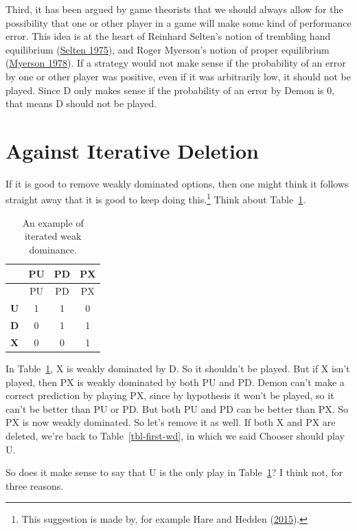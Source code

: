 \documentclass[
  12pt,
  letterpaper,
  DIV=11,
  numbers=noendperiod]{scrreprt}
\begin{document}
Third, it has been argued by game theorists that we should always allow
for the possibility that one or other player in a game will make some
kind of performance error. This idea is at the heart of Reinhard
Selten's notion of trembling hand equilibrium
(\protect\hyperlink{ref-Selten1975}{Selten 1975}), and Roger Myerson's
notion of proper equilibrium
(\protect\hyperlink{ref-Myerson1978}{Myerson 1978}). If a strategy would
not make sense if the probability of an error by one or other player was
positive, even if it was arbitrarily low, it should not be played. Since
D only makes sense if the probability of an error by Demon is 0, that
means D should not be played.

\hypertarget{sec-weak-iterate}{%
\section{Against Iterative Deletion}\label{sec-weak-iterate}}

If it is good to remove weakly dominated options, then one might think
it follows straight away that it is good to keep doing this.\footnote{This
  suggestion is made by, for example Hare and Hedden
  (\protect\hyperlink{ref-HareHedden2015}{2015}).} Think about
Table~\ref{tbl-wd-itd}.

\hypertarget{tbl-wd-itd}{}
\begin{longtable}[]{@{}cccc@{}}
\caption{\label{tbl-wd-itd}An example of iterated weak
dominance.}\tabularnewline
\toprule\noalign{}
& PU & PD & PX \\
\midrule\noalign{}
\endfirsthead
\toprule\noalign{}
& PU & PD & PX \\
\midrule\noalign{}
\endhead
\bottomrule\noalign{}
\endlastfoot
\textbf{U} & 1 & 1 & 0 \\
\textbf{D} & 0 & 1 & 1 \\
\textbf{X} & 0 & 0 & 1 \\
\end{longtable}

In Table~\ref{tbl-wd-itd}, X is weakly dominated by D. So it shouldn't
be played. But if X isn't played, then PX is weakly dominated by both PU
and PD. Demon can't make a correct prediction by playing PX, since by
hypothesis it won't be played, so it can't be better than PU or PD. But
both PU and PD can be better than PX. So PX is now weakly dominated. So
let's remove it as well. If both X and PX are deleted, we're back to
Table~\ref{tbl-first-wd}, in which we said Chooser should play U.

So does it make sense to say that U is the only play in
Table~\ref{tbl-wd-itd}? I think not, for three reasons.
\end{document}

